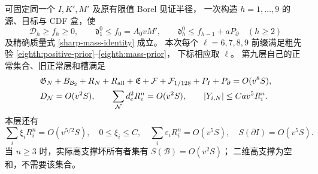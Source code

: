 \begin{lemma}[九层实际源族]\label{quant:nine-family}
可固定同一个 \(I,K',M'\) 及原有限值 Borel 见证半径，
一次构造 \(h=1,\ldots,9\) 的源、目标与 CDF 盒，使
\begin{equation}\label{quant:depth}
 \mathcal D_h\ge f_h\ge0,\qquad
 \mathfrak d_1^0\le f_0=A_0vM',\qquad
 \mathfrak d_h^0\le f_{h-1}+aP_\partial\quad(h\ge2)
\end{equation}
及精确质量式 \eqref{sharp-mass-identity} 成立。
本次每个 \(\ell=6,7,8,9\) 前缀满足粗先验
\eqref{eighth:positive-prior}--\eqref{eighth:mass-prior}，
下标相应取 \(\ell\)。
第九层自己的正常集合、旧正常层和槽满足
\begin{equation}\label{quant:stable}
 \begin{aligned}
 &\mathfrak G_N+B_{\mathcal B_2}+R_N+R_{\rm all}
   +\mathfrak E+\mathcal F+\mathcal F_{1/128}
   +P_I+P_\partial=O(v^8S),\\
 &D_{\mathcal N}=O(v^2S),\qquad
   \sum_{\mathcal N}d_e^2R_e^n=O(v^2S),\qquad
   |Y_{i,N}|\le Cav^5R_i^n .
 \end{aligned}
\end{equation}
本层还有
\begin{equation}\label{quant:rough-width}
 \sum_i\xi_iR_i^n=O(v^{5/2}S),\quad0\le\xi_i\le C,\quad
 \sum_i\varepsilon_iR_i^n=O(v^5S),\quad
 S(\partial I)=O(v^5S).
\end{equation}
当 \(n\ge3\) 时，实际高支撑坏所有者集有 \(S(\mathcal B)=O(v^2S)\)；
二维高支撑为空和，不需要该集合。
\end{lemma}
